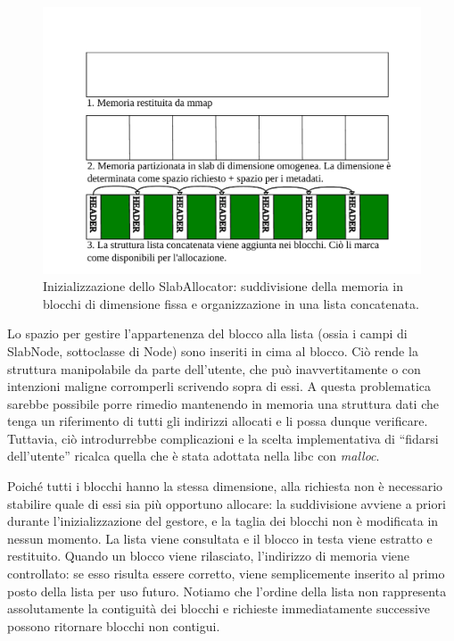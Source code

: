 \begin{figure}[H]
    \centering
    \includegraphics[width=1\textwidth]{images/slab/slab_allocator_init.pdf}
    \caption{Inizializzazione dello SlabAllocator: suddivisione della memoria in blocchi di dimensione fissa e organizzazione in una lista concatenata.}
    \label{fig:slab_allocator_init}
\end{figure}

Lo spazio per gestire l’appartenenza del blocco alla lista (ossia i campi di SlabNode, sottoclasse di Node) sono inseriti in cima al blocco. Ciò rende la struttura manipolabile da parte dell’utente, che può inavvertitamente o con intenzioni maligne corromperli scrivendo sopra di essi. A questa problematica sarebbe possibile porre rimedio mantenendo in memoria una struttura dati che tenga un riferimento di tutti gli indirizzi allocati e li possa dunque verificare. Tuttavia, ciò introdurrebbe complicazioni e la scelta implementativa di “fidarsi dell’utente” ricalca quella che è stata adottata nella libc con \textit{malloc}.

Poiché tutti i blocchi hanno la stessa dimensione, alla richiesta non è necessario stabilire quale di essi sia più opportuno allocare: la suddivisione avviene a priori durante l’inizializzazione del gestore, e la taglia dei blocchi non è modificata in nessun momento. La lista viene consultata e il blocco in testa viene estratto e restituito. Quando un blocco viene rilasciato, l’indirizzo di memoria viene controllato: se esso risulta essere corretto, viene semplicemente inserito al primo posto della lista per uso futuro. Notiamo che l’ordine della lista non rappresenta assolutamente la contiguità dei blocchi e richieste immediatamente successive possono ritornare blocchi non contigui.

